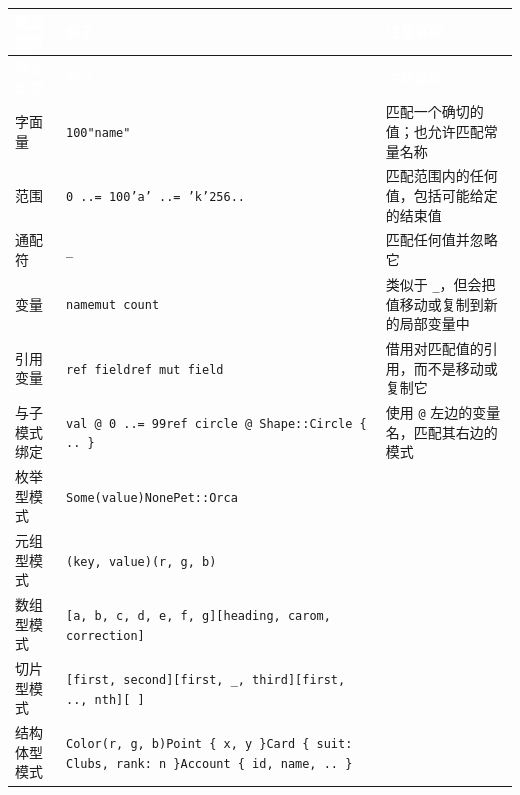 
\myTableBegin
\begin{xltabular}{\textwidth}{@{}>{\hsize\raggedright\arraybackslash}X>{\hsize\raggedright\arraybackslash}X>{\hsize\raggedright\arraybackslash}X@{}}
\textcolor{white}{模式类型} & \textcolor{white}{例子} & \textcolor{white}{注意事项} \\
\endfirsthead
{}\textcolor{white}{模式类型} & \textcolor{white}{例子} & \textcolor{white}{注意事项} \\
\endhead
字面量 & \texttt{100}\newline{}\texttt{"name"} & 匹配一个确切的值；也允许匹配常量名称 \\
范围 & \texttt{0 ..= 100}\newline{}\texttt{'a' ..= 'k'}\newline{}\texttt{256..} & 匹配范围内的任何值，包括可能给定的结束值 \\
通配符 & \texttt{\_} & 匹配任何值并忽略它 \\
变量 & \texttt{name}\newline{}\texttt{mut count} & 类似于 \texttt{\_}，但会把值移动或复制到新的局部变量中 \\
引用变量 & \texttt{ref field}\newline{}\texttt{ref mut field} & 借用对匹配值的引用，而不是移动或复制它 \\
与子模式绑定 & \texttt{val @ 0 ..= 99}\newline{}\texttt{ref circle @ Shape::Circle \{ .. \}} & 使用 \texttt{@} 左边的变量名，匹配其右边的模式 \\
枚举型模式 & \texttt{Some(value)}\newline{}\texttt{None}\newline{}\texttt{Pet::Orca} &  \\
元组型模式 & \texttt{(key, value)}\newline{}\texttt{(r, g, b)} &  \\
数组型模式 & \texttt{[a, b, c, d, e, f, g]}\newline{}\texttt{[heading, carom, correction]} &  \\
切片型模式 & \texttt{[first, second]}\newline{}\texttt{[first, \_, third]}\newline{}\texttt{[first, .., nth]}\newline{}\texttt{[ ]} &  \\
结构体型模式 & \texttt{Color(r, g, b)}\newline{}\texttt{Point \{ x, y \}}\newline{}\texttt{Card \{ suit: Clubs, rank: n \}}\newline{}\texttt{Account \{ id, name, .. \}} &  \\

\end{xltabular}
